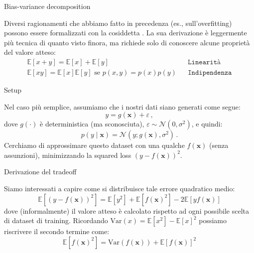 \documentclass[12pt,aspectratio=169]{beamer}
\begin{document}
\begin{frame}{Bias-variance decomposition}

	Diversi ragionamenti che abbiamo fatto in precedenza (es., sull'overfitting) possono essere formalizzati con la cosiddetta  . La sua derivazione è leggermente più tecnica di quanto visto finora, ma richiede solo di conoscere alcune proprietà del valore atteso:
	\begin{align}
		\mathbb{E}[x+y] = \mathbb{E}[x] + \mathbb{E}[y]                         &  & \texttt{Linearità}    \\
		\mathbb{E}[xy] = \mathbb{E}[x]\mathbb{E}[y] \text{ se } p(x,y)=p(x)p(y) &  & \texttt{Indipendenza}
	\end{align}

\end{frame}

\begin{frame}{Setup}

	Nel caso più semplice, assumiamo che i nostri dati siano generati come segue:
	\begin{equation}
		y = g(\mathbf{x}) + \varepsilon \,,
	\end{equation}
	dove $g(\cdot)$ è deterministica (ma sconosciuta), $\varepsilon \sim \mathcal{N}(0, \sigma^2)$, e quindi:
	\begin{equation}
		p(y \mid \mathbf{x}) = \mathcal{N}(y; g(\mathbf{x}), \sigma^2) \,.
	\end{equation}
	Cerchiamo di approssimare questo dataset con una qualche $f(\mathbf{x})$ (senza assunzioni), minimizzando la squared loss $(y - f(\mathbf{x}))^2$.

\end{frame}

\begin{frame}{Derivazione del tradeoff}

	Siamo interessati a capire come si distribuisce tale errore quadratico medio:
	\begin{equation}
		\mathbb{E}[(y-f(\mathbf{x}))^2] = \mathbb{E}[y^2] + \mathbb{E}[f(\mathbf{x})^2] - 2\mathbb{E}[yf(\mathbf{x})]
	\end{equation}
	dove (informalmente) il valore atteso è calcolato rispetto ad ogni possibile scelta di dataset di training. Ricordando $\text{Var}(x) = \mathbb{E}[x^2] - \mathbb{E}[x]^2$ possiamo riscrivere il secondo termine come:
	\begin{equation}
		\mathbb{E}[f(\mathbf{x})^2] = \text{Var}(f(\mathbf{x})) + \mathbb{E}[f(\mathbf{x})]^2
	\end{equation}

\end{frame}
\end{document}
